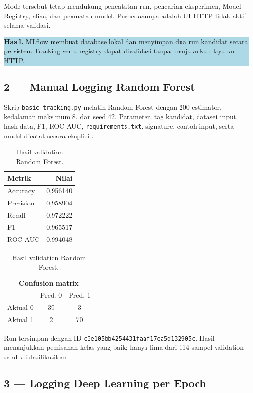 \documentclass[11pt,a4paper]{article}
\newcommand{\resultbox}[1]{%
  \begin{center}
    \colorbox{lightblue}{\parbox{0.91\linewidth}{\textbf{Hasil.} #1}}
  \end{center}
}
\begin{document}
Mode tersebut tetap mendukung pencatatan run, pencarian eksperimen, Model Registry, alias, dan pemuatan model. Perbedaannya adalah UI HTTP tidak aktif selama validasi.

\resultbox{MLflow membuat database lokal dan menyimpan dua run kandidat secara persisten. Tracking serta registry dapat divalidasi tanpa menjalankan layanan HTTP.}

\subsection{2 --- Manual Logging Random Forest}

Skrip \texttt{basic\_tracking.py} melatih Random Forest dengan 200 estimator, kedalaman maksimum 8, dan seed 42. Parameter, tag kandidat, dataset input, hash data, F1, ROC-AUC, \texttt{requirements.txt}, signature, contoh input, serta model dicatat secara eksplisit.

\begin{table}[ht]
\centering
\caption{Hasil validation Random Forest.}
\begin{tabular}{lr}
\toprule
Metrik & Nilai \\
\midrule
Accuracy & 0,956140 \\
Precision & 0,958904 \\
Recall & 0,972222 \\
F1 & 0,965517 \\
ROC-AUC & 0,994048 \\
\bottomrule
\end{tabular}
\hspace{1.3cm}
\begin{tabular}{c|cc}
\multicolumn{3}{c}{\textbf{Confusion matrix}} \\
 & Pred. 0 & Pred. 1 \\
\hline
Aktual 0 & 39 & 3 \\
Aktual 1 & 2 & 70 \\
\end{tabular}
\end{table}

Run tersimpan dengan ID \texttt{c3e105bb4254431faaf17ea5d132905c}. Hasil menunjukkan pemisahan kelas yang baik; hanya lima dari 114 sampel validation salah diklasifikasikan.

\subsection{3 --- Logging Deep Learning per Epoch}
\end{document}
